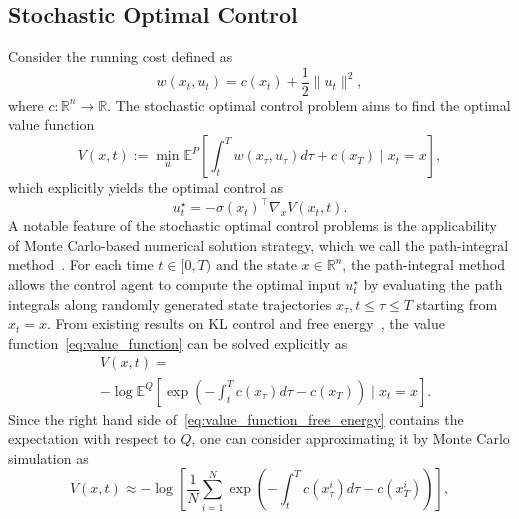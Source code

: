 \documentclass[letterpaper]{article} %
\begin{document}
\subsection{Stochastic Optimal Control}
Consider the running cost defined as
\begin{equation}
\label{eq:quadratic_cost_function}
    w(x_t, u_t)=c(x_t)+\frac{1}{2}\|u_t\|^2,
\end{equation}
where $c: \mathbb{R}^n \rightarrow \mathbb{R}$. 
The stochastic optimal control problem aims to find the optimal value function
\begin{equation}
\label{eq:value_function}
    V(x, t):=\min_{u}\mathbb{E}^{P}\left[\int_{t}^{T} w(x_\tau, u_\tau) d \tau+c\left(x_{T}\right) \mid x_{t}=x\right],
\end{equation}
which explicitly yields the optimal control  as
\begin{equation}
\label{eq:optimal_control_from_V}
    u_t^{\star}=-\sigma\left(x_t\right)^\top \nabla_x V\left(x_t, t\right).
\end{equation}
A notable feature of the stochastic optimal control problems is the applicability of Monte Carlo-based numerical solution strategy, which we call the path-integral method~\cite{thijssen2015path}. For each time $t \in[0, T)$ and the state $x \in \mathbb{R}^{n}$, the path-integral method allows the control agent to compute the optimal input $u_t^{\star}$ by evaluating the path integrals along randomly generated state trajectories $x_{\tau}, t \leq \tau \leq T$ starting from $x_{t}=x$.
From existing results on KL control and free energy~\cite{fleming2006controlled, boue1998variational, theodorou2012relative}, the value function~\eqref{eq:value_function} can be solved explicitly as
\begin{equation}
\label{eq:value_function_free_energy}
\begin{aligned}
    & V(x, t) = \\
    & -\log \mathbb{E}^{Q}\left[\exp \left(- \int_{t}^{T} c\left(x_{\tau}\right) d \tau- c\left(x_{T}\right)\right) \mid x_{t}=x\right].
\end{aligned}
\end{equation}
Since the right hand side of~\eqref{eq:value_function_free_energy} contains the expectation with respect to $Q$, one can consider approximating it by Monte Carlo simulation as
\begin{equation}
\label{eq:path_integral_MC_estimation}
    V(x, t) \approx 
     - \log \left[\frac{1}{N} \sum_{i=1}^{N} \exp \left(- \int_{t}^{T} c\left(x_{\tau}^{i}\right) d \tau- c\left(x_{T}^{i}\right)\right)\right],
\end{equation}
\end{document}
